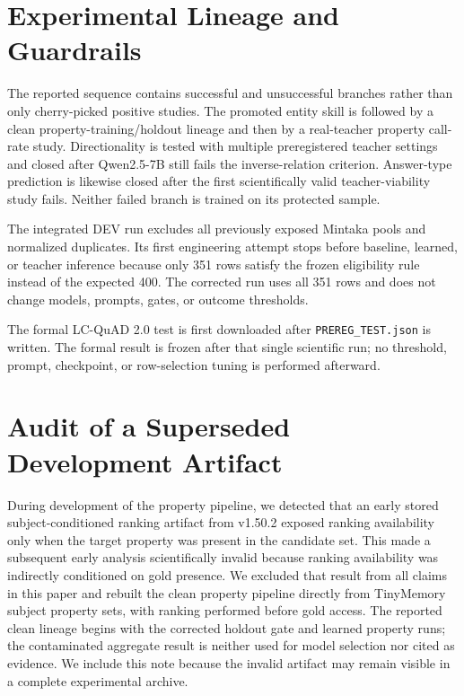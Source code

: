 \documentclass[10pt]{article}
\begin{document}
\appendix

\section{Experimental Lineage and Guardrails}\label{app:protocol}
The reported sequence contains successful and unsuccessful branches rather than only cherry-picked positive studies. The promoted entity skill is followed by a clean property-training/holdout lineage and then by a real-teacher property call-rate study. Directionality is tested with multiple preregistered teacher settings and closed after Qwen2.5-7B still fails the inverse-relation criterion. Answer-type prediction is likewise closed after the first scientifically valid teacher-viability study fails. Neither failed branch is trained on its protected sample.

The integrated DEV run excludes all previously exposed Mintaka pools and normalized duplicates. Its first engineering attempt stops before baseline, learned, or teacher inference because only 351 rows satisfy the frozen eligibility rule instead of the expected 400. The corrected run uses all 351 rows and does not change models, prompts, gates, or outcome thresholds.

The formal LC-QuAD 2.0 test is first downloaded after \texttt{PREREG\_TEST.json} is written. The formal result is frozen after that single scientific run; no threshold, prompt, checkpoint, or row-selection tuning is performed afterward.


\section{Audit of a Superseded Development Artifact}\label{app:superseded}
During development of the property pipeline, we detected that an early stored
subject-conditioned ranking artifact from v1.50.2 exposed ranking availability
only when the target property was present in the candidate set. This made a
subsequent early analysis scientifically invalid because ranking availability
was indirectly conditioned on gold presence. We excluded that result from all
claims in this paper and rebuilt the clean property pipeline directly from
TinyMemory subject property sets, with ranking performed before gold access.
The reported clean lineage begins with the corrected holdout gate and learned
property runs; the contaminated aggregate result is neither used for model
selection nor cited as evidence. We include this note because the invalid
artifact may remain visible in a complete experimental archive.
\end{document}
